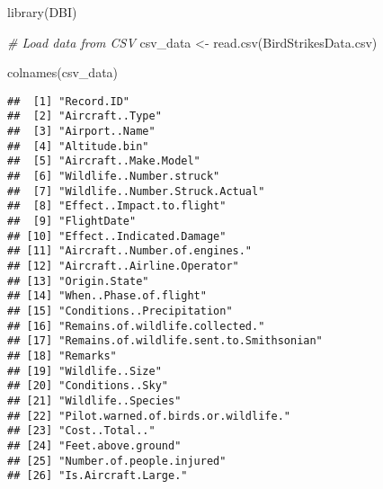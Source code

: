 \documentclass[
]{article}
\newenvironment{Shaded}{\begin{snugshade}}{\end{snugshade}}
\newcommand{\CommentTok}[1]{\textcolor[rgb]{0.56,0.35,0.01}{\textit{#1}}}
\newcommand{\FunctionTok}[1]{\textcolor[rgb]{0.00,0.00,0.00}{#1}}
\newcommand{\NormalTok}[1]{#1}
\newcommand{\OtherTok}[1]{\textcolor[rgb]{0.56,0.35,0.01}{#1}}
\newcommand{\StringTok}[1]{\textcolor[rgb]{0.31,0.60,0.02}{#1}}
\begin{document}
\begin{Shaded}
\begin{Highlighting}[]
\FunctionTok{library}\NormalTok{(DBI)}

\CommentTok{\# Load data from CSV}
\NormalTok{csv\_data }\OtherTok{\textless{}{-}} \FunctionTok{read.csv}\NormalTok{(}\StringTok{\textquotesingle{}BirdStrikesData.csv\textquotesingle{}}\NormalTok{)}
\end{Highlighting}
\end{Shaded}

\begin{Shaded}
\begin{Highlighting}[]
\FunctionTok{colnames}\NormalTok{(csv\_data)}
\end{Highlighting}
\end{Shaded}

\begin{verbatim}
##  [1] "Record.ID"                              
##  [2] "Aircraft..Type"                         
##  [3] "Airport..Name"                          
##  [4] "Altitude.bin"                           
##  [5] "Aircraft..Make.Model"                   
##  [6] "Wildlife..Number.struck"                
##  [7] "Wildlife..Number.Struck.Actual"         
##  [8] "Effect..Impact.to.flight"               
##  [9] "FlightDate"                             
## [10] "Effect..Indicated.Damage"               
## [11] "Aircraft..Number.of.engines."           
## [12] "Aircraft..Airline.Operator"             
## [13] "Origin.State"                           
## [14] "When..Phase.of.flight"                  
## [15] "Conditions..Precipitation"              
## [16] "Remains.of.wildlife.collected."         
## [17] "Remains.of.wildlife.sent.to.Smithsonian"
## [18] "Remarks"                                
## [19] "Wildlife..Size"                         
## [20] "Conditions..Sky"                        
## [21] "Wildlife..Species"                      
## [22] "Pilot.warned.of.birds.or.wildlife."     
## [23] "Cost..Total.."                          
## [24] "Feet.above.ground"                      
## [25] "Number.of.people.injured"               
## [26] "Is.Aircraft.Large."
\end{verbatim}
\end{document}
